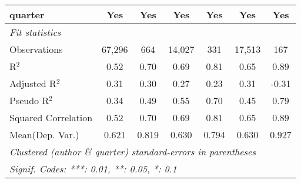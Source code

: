 \begin{tabular}{lcccccc}
   quarter                                                    & Yes           & Yes          & Yes          & Yes           & Yes           & Yes\\  
   \midrule
   \emph{Fit statistics}\\
   Observations                                               & 67,296        & 664          & 14,027       & 331           & 17,513        & 167\\  
   R$^2$                                                      & 0.52          & 0.70         & 0.69         & 0.81          & 0.65          & 0.89\\  
   Adjusted R$^2$                                             & 0.31          & 0.30         & 0.27         & 0.23          & 0.31          & -0.31\\  
   Pseudo R$^2$                                               & 0.34          & 0.49         & 0.55         & 0.70          & 0.45          & 0.79\\  
   Squared Correlation                                        & 0.52          & 0.70         & 0.69         & 0.81          & 0.65          & 0.89\\  
Mean(Dep. Var.) & 0.621 & 0.819 & 0.630 & 0.794 & 0.630 & 0.927 \\
   \midrule \midrule
   \multicolumn{7}{l}{\emph{Clustered (author \& quarter) standard-errors in parentheses}}\\
   \multicolumn{7}{l}{\emph{Signif. Codes: ***: 0.01, **: 0.05, *: 0.1}}\\
\end{tabular}
\par\endgroup
